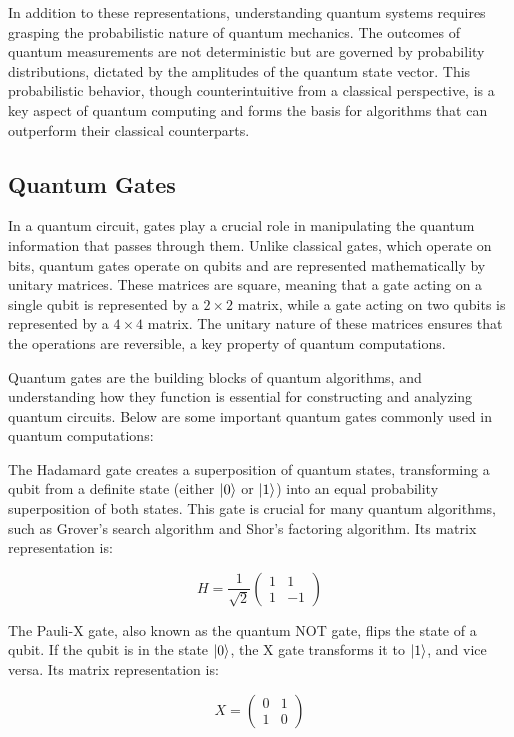 \documentclass{article}
\begin{document}
	In addition to these representations, understanding quantum systems requires grasping the probabilistic nature of quantum mechanics. The outcomes of quantum measurements are not deterministic but are governed by probability distributions, dictated by the amplitudes of the quantum state vector. This probabilistic behavior, though counterintuitive from a classical perspective, is a key aspect of quantum computing and forms the basis for algorithms that can outperform their classical counterparts.

	\subsection{Quantum Gates} 
	In a quantum circuit, gates play a crucial role in manipulating the quantum information that passes through them. Unlike classical gates, which operate on bits, quantum gates operate on qubits and are represented mathematically by unitary matrices. These matrices are square, meaning that a gate acting on a single qubit is represented by a $2 \times 2$ matrix, while a gate acting on two qubits is represented by a $4 \times 4$ matrix. The unitary nature of these matrices ensures that the operations are reversible, a key property of quantum computations.

	Quantum gates are the building blocks of quantum algorithms, and understanding how they function is essential for constructing and analyzing quantum circuits. Below are some important quantum gates commonly used in quantum computations:

	The Hadamard gate creates a superposition of quantum states, transforming a qubit from a definite state (either $\ket{0}$ or $\ket{1}$) into an equal probability superposition of both states. This gate is crucial for many quantum algorithms, such as Grover's search algorithm and Shor's factoring algorithm. Its matrix representation is:

	\[
	H = \frac{1}{\sqrt{2}} \begin{pmatrix} 
	1 & 1 \\ 
	1 & -1 
	\end{pmatrix}
	\]

	The Pauli-X gate, also known as the quantum NOT gate, flips the state of a qubit. If the qubit is in the state $\ket{0}$, the X gate transforms it to $\ket{1}$, and vice versa. Its matrix representation is:

	\[
	X = \begin{pmatrix} 
	0 & 1 \\ 
	1 & 0 
	\end{pmatrix}
	\]
\end{document}
